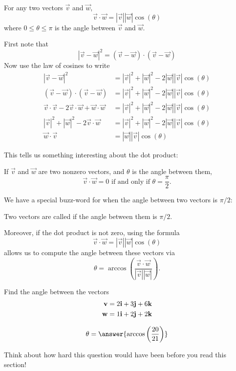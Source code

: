 \documentclass{ximera}
\begin{document}
\begin{theorem}
  For any two vectors $\vec{v}$ and $\vec{w}$,
  \[
  \vec{v} \cdot \vec{w} = |\vec{v}||\vec{w}|\cos(\theta)
  \]
  where $0\le \theta\le\pi$ is the angle between $\vec{v}$ and
  $\vec{w}$.
  \begin{explanation}
    First note that
    \[
    |\vec{v} - \vec{w}|^2 =  (\vec{v} - \vec{w})\cdot(\vec{v} - \vec{w})
    \]
    Now use the law of cosines to write
    \begin{align*}
      |\vec{v} - \vec{w}|^2&=|\vec{v}|^2+|\vec{w}|^2-2|\vec{w}||\vec{v}|\cos(\theta)\\
      (\vec{v} - \vec{w})\cdot(\vec{v} - \vec{w}) &=|\vec{v}|^2+|\vec{w}|^2-2|\vec{w}||\vec{v}|\cos(\theta)\\
      \vec{v}\cdot\vec{v} -2\vec{v}\cdot\vec{w}+\vec{w}\cdot\vec{w}&=|\vec{v}|^2+|\vec{w}|^2-2|\vec{w}||\vec{v}|\cos(\theta)\\
      |\vec{v}|^2+|\vec{w}|^2 -2\vec{v}\cdot\vec{w} &=|\vec{v}|^2+|\vec{w}|^2-2|\vec{w}||\vec{v}|\cos(\theta)\\
      \vec{w} \cdot \vec{v} &= |\vec{w}||\vec{v}|\cos(\theta)
    \end{align*}
  \end{explanation}
\end{theorem}
	
This tells us something interesting about the dot product:

\begin{theorem}
  If $\vec{v}$ and $\vec{w}$ are two nonzero vectors, and $\theta$ is
  the angle between them,
  \[
  \vec{v}\cdot \vec{w} = 0 \text{ if and only if } \theta=
  \frac{\pi}{2}.
  \]
\end{theorem}

We have a special buzz-word for when the angle between two vectors is $\pi/2$:

\begin{definition}
  Two vectors are called  if the angle between them is
  $\pi/2$.
\end{definition}

Moreover, if the dot product is not zero, using the formula
\[
\vec{v} \cdot \vec{w} = |\vec{v}||\vec{w}|\cos(\theta)
\]
allows us to compute the angle between these vectors via
\[
\theta = \arccos\left(\frac{\vec{v} \cdot \vec{w} }{|\vec{v}||\vec{w}|}\right).
\]

\begin{question}
  Find the angle between the vectors
  \begin{align*}
  \mathbf{v} &= 2\mathbf{i}+3\mathbf{j}+6\mathbf{k}\\
  \mathbf{w} &= 1\mathbf{i}+2\mathbf{j}+2\mathbf{k}
  \end{align*}
  \begin{prompt}
  \[
  \theta = \answer{ \arccos\left(\frac{20}{21}\right)}
  \]
  \end{prompt}
  \begin{feedback}
    Think about how hard this question would have been before you read this section!
  \end{feedback}
\end{question}
\end{document}
